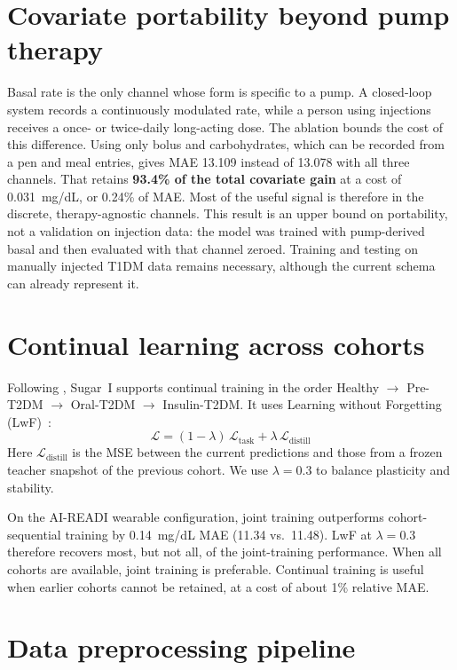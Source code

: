 \documentclass[11pt,a4paper]{article}
\begin{document}
\section{Covariate portability beyond pump therapy}
\label{app:portability}

Basal rate is the only channel whose form is specific to a pump.
A closed-loop system records a continuously modulated rate, while a person using injections receives a once- or twice-daily long-acting dose.
The ablation bounds the cost of this difference.
Using only bolus and carbohydrates, which can be recorded from a pen and meal entries, gives MAE 13.109 instead of 13.078 with all three channels.
That retains \textbf{93.4\% of the total covariate gain} at a cost of 0.031~mg/dL, or 0.24\% of MAE.
Most of the useful signal is therefore in the discrete, therapy-agnostic channels.
This result is an upper bound on portability, not a validation on injection data: the model was trained with pump-derived basal and then evaluated with that channel zeroed.
Training and testing on manually injected T1DM data remains necessary, although the current schema can already represent it.

\section{Continual learning across cohorts}
\label{app:continual}

Following \citet{farahmand2025glumind}, Sugar~I supports continual training in the order Healthy $\to$ Pre-T2DM $\to$ Oral-T2DM $\to$ Insulin-T2DM.
It uses Learning without Forgetting (LwF)~\citep{li2018lwf}:
\begin{equation}
    \mathcal{L} = (1 - \lambda)\,\mathcal{L}_\text{task} + \lambda\,\mathcal{L}_\text{distill}
\end{equation}
Here $\mathcal{L}_\text{distill}$ is the MSE between the current predictions and those from a frozen teacher snapshot of the previous cohort.
We use $\lambda = 0.3$ to balance plasticity and stability.

On the AI-READI wearable configuration, joint training outperforms cohort-sequential training by 0.14~mg/dL MAE (11.34 vs.\ 11.48).
LwF at $\lambda = 0.3$ therefore recovers most, but not all, of the joint-training performance.
When all cohorts are available, joint training is preferable.
Continual training is useful when earlier cohorts cannot be retained, at a cost of about 1\% relative MAE.

\section{Data preprocessing pipeline}
\label{app:pipeline}
\end{document}
